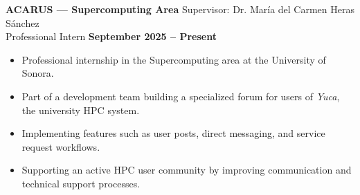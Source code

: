 \documentclass[11pt]{article}
\begin{document}
\vspace{0.2cm}
\textbf{ACARUS — Supercomputing Area} \hfill Supervisor: Dr. María del Carmen Heras Sánchez\\
Professional Intern \hfill \textbf{September 2025 -- Present}
\vspace{-0.3cm}
\begin{itemize}[leftmargin=*]
    \item Professional internship in the Supercomputing area at the University of Sonora.
    
    \vspace{-0.3cm}
    \item Part of a development team building a specialized forum for users of \textit{Yuca}, the university HPC system.
    
    \vspace{-0.3cm}
    \item Implementing features such as user posts, direct messaging, and service request workflows.
    
    \vspace{-0.3cm}
    \item Supporting an active HPC user community by improving communication and technical support processes.
\end{itemize}





\end{document}
